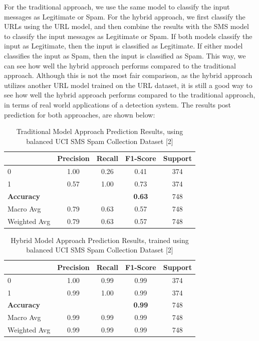 \documentclass{article}
\begin{document}
\noindent
For the traditional approach, we use the same model to classify the input messages as Legitimate or Spam. For the hybrid approach, we first classify the URLs using the URL model, and then combine the results with the SMS model to classify the input messages as Legitimate or Spam. If both models classify the input as Legitimate, then the input is classified as Legitimate. If either model classifies the input as Spam, then the input is classified as Spam. This way, we can see how well the hybrid approach performs compared to the traditional approach. Although this is not the most fair comparison, as the hybrid approach utilizes another URL model trained on the URL dataset, it is still a good way to see how well the hybrid approach performs compared to the traditional approach, in terms of real world applications of a detection system. The results post prediction for both approaches, are shown below:


\begin{table}[htbp]
    \centering
    \caption{Traditional Model Approach Prediction Results, using balanced UCI SMS Spam Collection Dataset [2]}
    \begin{tabular}{l c c c c}
    \toprule
     & Precision & Recall & F1-Score & Support \\
    \midrule
    0 & 1.00 & 0.26 & 0.41 & 374 \\
    1 & 0.57 & 1.00 & 0.73 & 374 \\
    \midrule
    \textbf{Accuracy} & & & \textbf{0.63} & 748 \\
    Macro Avg & 0.79 & 0.63 & 0.57 & 748 \\
    Weighted Avg & 0.79 & 0.63 & 0.57 & 748 \\
    \bottomrule
    \end{tabular}
    \label{tab:classification_report_4}
\end{table}

\begin{table}[htbp]
    \centering
    \caption{Hybrid Model Approach Prediction Results, trained using balanced UCI SMS Spam Collection Dataset [2]}
    \begin{tabular}{l c c c c}
    \toprule
     & Precision & Recall & F1-Score & Support \\
    \midrule
    0 & 1.00 & 0.99 & 0.99 & 374 \\
    1 & 0.99 & 1.00 & 0.99 & 374 \\
    \midrule
    \textbf{Accuracy} & & & \textbf{0.99} & 748 \\
    Macro Avg & 0.99 & 0.99 & 0.99 & 748 \\
    Weighted Avg & 0.99 & 0.99 & 0.99 & 748 \\
    \bottomrule
    \end{tabular}
    \label{tab:classification_report_5}
\end{table}
\end{document}
